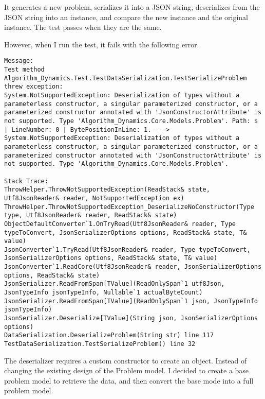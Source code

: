 \documentclass[report.tex]{subfiles}
\begin{document}
It generates a new problem, serializes it into a JSON string, deserializes from the JSON string into an instance, and compare the new instance and the original instance. The test passes when they are the same.

However, when I run the test, it fails with the following error.

\begin{verbatim}
Message: 
Test method Algorithm_Dynamics.Test.TestDataSerialization.TestSerializeProblem threw exception: 
System.NotSupportedException: Deserialization of types without a parameterless constructor, a singular parameterized constructor, or a parameterized constructor annotated with 'JsonConstructorAttribute' is not supported. Type 'Algorithm_Dynamics.Core.Models.Problem'. Path: $ | LineNumber: 0 | BytePositionInLine: 1. ---> System.NotSupportedException: Deserialization of types without a parameterless constructor, a singular parameterized constructor, or a parameterized constructor annotated with 'JsonConstructorAttribute' is not supported. Type 'Algorithm_Dynamics.Core.Models.Problem'.

Stack Trace: 
ThrowHelper.ThrowNotSupportedException(ReadStack& state, Utf8JsonReader& reader, NotSupportedException ex)
ThrowHelper.ThrowNotSupportedException_DeserializeNoConstructor(Type type, Utf8JsonReader& reader, ReadStack& state)
ObjectDefaultConverter`1.OnTryRead(Utf8JsonReader& reader, Type typeToConvert, JsonSerializerOptions options, ReadStack& state, T& value)
JsonConverter`1.TryRead(Utf8JsonReader& reader, Type typeToConvert, JsonSerializerOptions options, ReadStack& state, T& value)
JsonConverter`1.ReadCore(Utf8JsonReader& reader, JsonSerializerOptions options, ReadStack& state)
JsonSerializer.ReadFromSpan[TValue](ReadOnlySpan`1 utf8Json, JsonTypeInfo jsonTypeInfo, Nullable`1 actualByteCount)
JsonSerializer.ReadFromSpan[TValue](ReadOnlySpan`1 json, JsonTypeInfo jsonTypeInfo)
JsonSerializer.Deserialize[TValue](String json, JsonSerializerOptions options)
DataSerialization.DeserializeProblem(String str) line 117
TestDataSerialization.TestSerializeProblem() line 32
\end{verbatim}

The deserializer requires a custom constructor to create an object. Instead of changing the existing design of the Problem model. I decided to create a base problem model to retrieve the data, and then convert the base mode into a full problem model.
\end{document}
